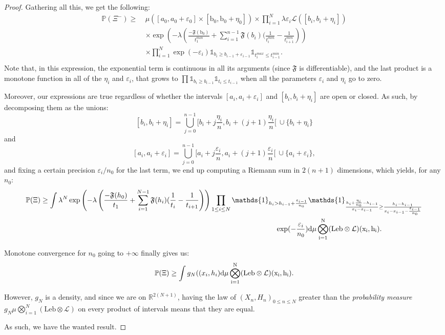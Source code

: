 \documentclass[10pt,english,a4paper]{smfart}
\theoremstyle{definition}
\theoremstyle{remark}
\newcommand{\R}{\mathbb{R}}
\newcommand{\Leb}{\mathrm{Leb}}
\newcommand{\primi}{\mathfrak{F}}
\newcommand{\event}{\Xi}
\newcommand{\p}{\mathbb{P}}
\renewcommand{\epsilon}{\varepsilon}
\begin{document}
\begin{proof}
Gathering all this, we get the following:
\begin{align*}
    \p(\event^-) \geq \ &\mu([a_0, a_0+\epsilon_0]\times [\mathrm{b}_0, \mathrm{b}_0+\eta_0])\times \prod_{i=1}^{N}\lambda\epsilon_i  \mathcal{L}([b_i, b_i +\eta_i]) \\
    &\times\exp\left(-\lambda\left(\frac{-\primi(\mathrm{b}_0)}{t^{min}_1}+\sum_{i=1}^{n-1}\primi(b_i)(\frac{1}{t^{min}_{i}}-\frac{1}{t^{min}_{i+1}}\right)\right)\\
    &\times\prod_{i = 1}^{N} \exp(-\epsilon_i) \mathds{1}_{b_i\geq b_{i-1}+\epsilon_{i-1}}\mathds{1}_{t^{max}_i \leq t^{min}_{i-1}}.\\
\end{align*}
Note that, in this expression, the exponential term is continuous in all its arguments (since $\primi$ is differentiable), and the last product is a monotone function in all of the $\eta_i$ and $\epsilon_i$, that grows to $\prod \mathds{1}_{b_i\geq b_{i-1}}\mathds{1}_{t_i \leq t_{i-1}}$ when all the parameters $\epsilon_i$ and $\eta_i$ go to zero.

Moreover, our expressions are true regardless of whether the intervals $[a_i, a_i+\epsilon_i]$ and $[b_i, b_i+\eta_i]$ are open or closed. As such, by decomposing them as the unions:
\[[b_i, b_i+\eta_i] = \bigcup_{j = 0}^{n-1}\biggl[b_i+j\frac{\eta_i}{n}, b_i+(j+1)\frac{\eta_i}{n}\biggl[ \ \cup \{b_i+\eta_i\}\]
and
\[[a_i, a_i+\epsilon_i] = \bigcup_{j = 0}^{n-1}\biggl[a_i+j\frac{\epsilon_i}{n}, a_i+(j+1)\frac{\epsilon_i}{n}\biggl[ \ \cup \{a_i+\epsilon_i\},\]
and fixing a certain precision $\epsilon_i/n_0$ for the last term, we end up computing a Riemann sum in $2(n+1)$ dimensions, which yields, for any $n_0$:
\begin{align*}
\p(\event)\geq \int\lambda^N\exp\left(-\lambda\left(\frac{-\primi(h_0)}{t_1}+\sum_{i=1}^{N-1}\primi(h_i)(\frac{1}{t_{i}}-\frac{1}{t_{i+1}}\right)\right)\prod_{1\leq i\leq N}\mathds{1}_{h_i> h_{i-1}+\frac{\epsilon_{i-1}}{n_0}}&\mathds{1}_{\frac{h_i+\frac{\eta_i}{n_0}-h_{i-1}}{x_i-x_{i-1}}\geq\frac{h_i-h_{i-1}}{x_i-x_{i-1}-\frac{\epsilon_{i-1}}{n_0}} }\\\exp(-\frac{\epsilon_i}{n_0})
&\rm{d}\mu\displaystyle\bigotimes_{i=1}^{N} (\Leb \otimes \mathcal{L})(x_i, h_i).
\end{align*}

Monotone convergence for $n_0$ going to $+\infty$ finally gives us:
\[\p(\event)\geq \int g_N((x_i, h_i)\rm{d}\mu\displaystyle\bigotimes_{i=1}^{N} (\Leb \otimes \mathcal{L})(x_i, h_i).\]

However, $g_N$ is a density, and since we are on $\R^{2(N+1)}$, having the law of $(X_n, H_n)_{0\leq n\leq N}$ greater than the \textit{probability measure} $g_N\mu\displaystyle\bigotimes_{i=1}^{N} (\Leb \otimes \mathcal{L})$ on every product of intervals means that they are equal. 

As such, we have the wanted result.
\end{proof}
\end{document}
